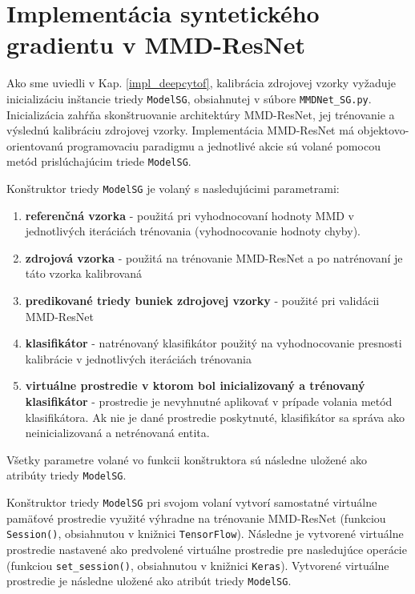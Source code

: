\section{Implementácia syntetického gradientu v MMD-ResNet}
\label{implementacia_MMD-ResNet}

Ako sme uviedli v Kap. \ref{impl_deepcytof}, kalibrácia zdrojovej vzorky vyžaduje inicializáciu inštancie triedy \texttt{ModelSG}, obsiahnutej v súbore \texttt{MMDNet_SG.py}. Inicializácia zahŕňa skonštruovanie architektúry MMD-ResNet, jej trénovanie a výslednú kalibráciu zdrojovej vzorky. Implementácia MMD-ResNet má objektovo-orientovanú programovaciu paradigmu a jednotlivé akcie sú volané pomocou metód prislúchajúcim triede \texttt{ModelSG}. 

Konštruktor triedy \texttt{ModelSG} je volaný s nasledujúcimi parametrami:
\begin{enumerate}
    \item \textbf{referenčná vzorka} - použitá pri vyhodnocovaní hodnoty MMD v jednotlivých iteráciách trénovania (vyhodnocovanie hodnoty chyby).
    \item \textbf{zdrojová vzorka} - použitá na trénovanie MMD-ResNet a po natrénovaní je táto vzorka kalibrovaná
    \item \textbf{predikované triedy buniek zdrojovej vzorky} - použité pri validácii MMD-ResNet
    \item \textbf{klasifikátor} - natrénovaný klasifikátor použitý na vyhodnocovanie presnosti kalibrácie v jednotlivých iteráciách trénovania
    \item \textbf{virtuálne prostredie v ktorom bol inicializovaný a trénovaný klasifikátor} - prostredie je nevyhnutné aplikovať v prípade volania metód klasifikátora. Ak nie je dané prostredie poskytnuté, klasifikátor sa správa ako neinicializovaná a netrénovaná entita.
\end{enumerate}
Všetky parametre volané vo funkcii konštruktora sú následne uložené ako atribúty triedy \texttt{ModelSG}.

Konštruktor triedy \texttt{ModelSG} pri svojom volaní vytvorí samostatné virtuálne pamäťové prostredie využité výhradne na trénovanie MMD-ResNet (funkciou \texttt{Session()}, obsiahnutou v knižnici \texttt{TensorFlow}). Následne je vytvorené virtuálne prostredie nastavené ako predvolené virtuálne prostredie pre nasledujúce operácie (funkciou \texttt{set_session()}, obsiahnutou v knižnici \texttt{Keras}). Vytvorené virtuálne prostredie je následne uložené ako atribút triedy \texttt{ModelSG}.

